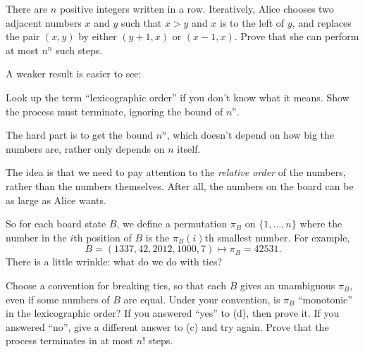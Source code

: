 \begin{example*}
	There are $n$ positive integers written in a row.
	Iteratively, Alice chooses two adjacent numbers $x$ and $y$
	such that $x>y$ and $x$ is to the left of $y$,
	and replaces the pair $(x,y)$ by either $(y+1,x)$ or $(x-1,x)$.
	Prove that she can perform at most $n^n$ such steps.
\end{example*} 

\begin{walkthrough}
	A weaker result is easier to see:
	\begin{walk}
		\ii Look up the term ``lexicographic order'' if you don't know what it means.
		\ii Show the process must terminate, ignoring the bound of $n^n$.
	\end{walk}
	The hard part is to get the bound $n^n$,
	which doesn't depend on how big the numbers are,
	rather only depends on $n$ itself.

	The idea is that we need to pay attention to the \emph{relative order}
	of the numbers, rather than the numbers themselves.
	After all, the numbers on the board can be as large as Alice wants.

	So for each board state $B$,
	we define a permutation $\pi_B$ on $\{1,\dots,n\}$
	where the number in the $i$th position of $B$
	is the $\pi_B(i)$th smallest number. For example,
	\[ B = (1337, 42, 2012, 1000, 7)
		\longmapsto \pi_B = 42531. \]
	There is a little wrinkle: what do we do with ties?
	\begin{walk}[resume]
		\ii Choose a convention for breaking ties, so that each $B$ gives
		an unambiguous $\pi_B$, even if some numbers of $B$ are equal.
		\ii Under your convention, is $\pi_B$ ``monotonic'' in the lexicographic order?
		\ii If you answered ``yes'' to (d), then prove it.
		If you answered ``no'', give a different answer to (c) and try again.
		\ii Prove that the process terminates in at most $n!$ steps.
	\end{walk}
\end{walkthrough}

